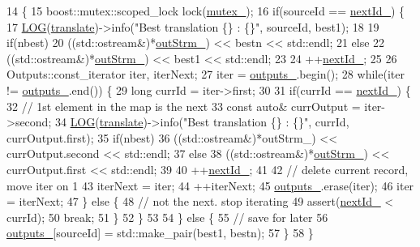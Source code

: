 \begin{DoxyCode}
14                                         \{
15   boost::mutex::scoped\_lock lock(\hyperlink{classmarian_1_1OutputCollector_acded8bfaafbb69d10e32a4b38263e08b}{mutex\_});
16   \textcolor{keywordflow}{if}(sourceId == \hyperlink{classmarian_1_1OutputCollector_a0d936e88142afee4f490f6f39a66b792}{nextId\_}) \{
17     \hyperlink{amun_2common_2logging_8h_a8cad147aca8c526d3c8a03ae14d5c87d}{LOG}(\hyperlink{amunmt_8cpp_a86ebd9110196f3b5328ad3c3d31cd007}{translate})->info(\textcolor{stringliteral}{"Best translation \{\} : \{\}"}, sourceId, best1);
18 
19     \textcolor{keywordflow}{if}(nbest)
20       ((std::ostream&)*\hyperlink{classmarian_1_1OutputCollector_a09fede155203845f26bf55be5d38e009}{outStrm\_}) << bestn << std::endl;
21     \textcolor{keywordflow}{else}
22       ((std::ostream&)*\hyperlink{classmarian_1_1OutputCollector_a09fede155203845f26bf55be5d38e009}{outStrm\_}) << best1 << std::endl;
23 
24     ++\hyperlink{classmarian_1_1OutputCollector_a0d936e88142afee4f490f6f39a66b792}{nextId\_};
25 
26     Outputs::const\_iterator iter, iterNext;
27     iter = \hyperlink{classmarian_1_1OutputCollector_a58dc9b7a62760be77669cd7ad612668e}{outputs\_}.begin();
28     \textcolor{keywordflow}{while}(iter != \hyperlink{classmarian_1_1OutputCollector_a58dc9b7a62760be77669cd7ad612668e}{outputs\_}.end()) \{
29       \textcolor{keywordtype}{long} currId = iter->first;
30 
31       \textcolor{keywordflow}{if}(currId == \hyperlink{classmarian_1_1OutputCollector_a0d936e88142afee4f490f6f39a66b792}{nextId\_}) \{
32         \textcolor{comment}{// 1st element in the map is the next}
33         \textcolor{keyword}{const} \textcolor{keyword}{auto}& currOutput = iter->second;
34         \hyperlink{amun_2common_2logging_8h_a8cad147aca8c526d3c8a03ae14d5c87d}{LOG}(\hyperlink{amunmt_8cpp_a86ebd9110196f3b5328ad3c3d31cd007}{translate})->info(\textcolor{stringliteral}{"Best translation \{\} : \{\}"}, currId, currOutput.first);
35         \textcolor{keywordflow}{if}(nbest)
36           ((std::ostream&)*outStrm\_) << currOutput.second << std::endl;
37         \textcolor{keywordflow}{else}
38           ((std::ostream&)*\hyperlink{classmarian_1_1OutputCollector_a09fede155203845f26bf55be5d38e009}{outStrm\_}) << currOutput.first << std::endl;
39 
40         ++\hyperlink{classmarian_1_1OutputCollector_a0d936e88142afee4f490f6f39a66b792}{nextId\_};
41 
42         \textcolor{comment}{// delete current record, move iter on 1}
43         iterNext = iter;
44         ++iterNext;
45         \hyperlink{classmarian_1_1OutputCollector_a58dc9b7a62760be77669cd7ad612668e}{outputs\_}.erase(iter);
46         iter = iterNext;
47       \} \textcolor{keywordflow}{else} \{
48         \textcolor{comment}{// not the next. stop iterating}
49         assert(\hyperlink{classmarian_1_1OutputCollector_a0d936e88142afee4f490f6f39a66b792}{nextId\_} < currId);
50         \textcolor{keywordflow}{break};
51       \}
52     \}
53 
54   \} \textcolor{keywordflow}{else} \{
55     \textcolor{comment}{// save for later}
56     \hyperlink{classmarian_1_1OutputCollector_a58dc9b7a62760be77669cd7ad612668e}{outputs\_}[sourceId] = std::make\_pair(best1, bestn);
57   \}
58 \}
\end{DoxyCode}


